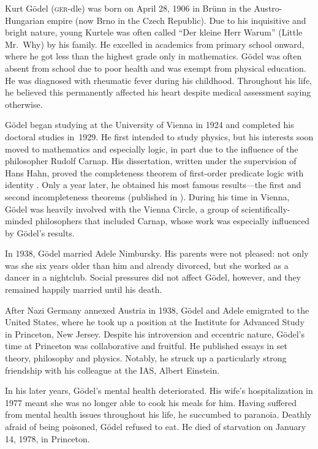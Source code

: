 \documentclass[../../../include/open-logic-section]{subfiles}
\begin{document}



Kurt G{\"o}del (\textsc{ger}-dle) was born on April 28, 1906 in
Br{\"u}nn in the Austro-Hungarian empire (now Brno in the Czech
Republic). Due to his inquisitive and bright nature, young Kurtele was
often called ``Der kleine Herr Warum'' (Little Mr.~Why) by his
family. He excelled in academics from primary school onward, where he
got less than the highest grade only in mathematics. G{\"o}del was
often absent from school due to poor health and was exempt from
physical education. He was diagnosed with rheumatic fever
during his childhood. Throughout his life, he believed this
permanently affected his heart despite medical assessment saying
otherwise.

G{\"o}del began studying at the University of Vienna in 1924 and
completed his doctoral studies in~1929. He first intended to study
physics, but his interests soon moved to mathematics and especially
logic, in part due to the influence of the philosopher Rudolf
Carnap. His dissertation, written under the supervision of Hans Hahn,
proved the completeness theorem of first-order predicate logic with
identity \citep{Godel1929}. Only a year later, he obtained his most
famous results---the first and second incompleteness theorems
(published in \citealt{Godel1931}). During his time in Vienna,
G{\"o}del was heavily involved with the Vienna Circle, a group of
scientifically-minded philosophers that included Carnap, whose work
was especially influenced by G{\"o}del's results.

In 1938, G\"odel married Adele Nimbursky. His parents were not
pleased: not only was she six years older than him and already
divorced, but she worked as a dancer in a nightclub. 
Social pressures did not affect G{\"o}del, however,
and they remained happily married until his death.

After Nazi Germany annexed Austria in 1938, G{\"o}del and Adele
emigrated to the United States, where he took up a position at the
Institute for Advanced Study in Princeton, New Jersey. Despite his
introversion and eccentric nature, G{\"o}del's time at Princeton was
collaborative and fruitful.  He published essays in set theory,
philosophy and physics. Notably, he struck up a particularly strong
friendship with his colleague at the IAS, Albert Einstein.

In his later years, G{\"o}del's mental health deteriorated. His wife's
hospitalization in 1977 meant she was no longer able to cook his meals
for him. Having suffered from mental health issues throughout his
life, he succumbed to paranoia. Deathly afraid of being poisoned,
G{\"o}del refused to eat. He died of starvation on January 14, 1978, in
Princeton.
\end{document}
